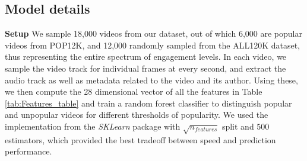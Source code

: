 \subsection{Model details}
\label{sec:model-details}
\noindent\textbf{Setup}
We sample 18,000 videos from our dataset, out of which 6,000 are popular videos from  POP12K, and 12,000 randomly sampled from the ALL120K dataset, thus representing the entire spectrum of engagement levels. In each video, we sample the video track for individual frames at every second, and extract the audio track as well as metadata related to the video and its author. Using these, we then compute the 28 dimensional vector of all the features in Table \ref{tab:Features_table} and train a random forest classifier to distinguish popular and unpopular videos for different thresholds of popularity. We used the implementation from the \emph{SKLearn} package with $\sqrt{n_{features}}$ split and $500$ estimators, which provided the best tradeoff between speed and prediction performance.
 

